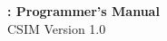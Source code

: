 \begin{flushleft}
  \Huge  
  \textbf{\csim: Programmer's Manual}\\
  {\Large CSIM Version 1.0} \\

\end{flushleft}

